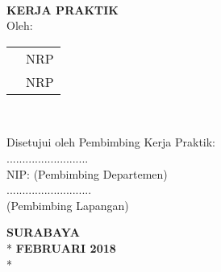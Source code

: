 \newpage
	\thispagestyle{plain}
	\begin{centering}
		\textbf{\MakeUppercase{\judul}} \\[20pt]
		\textbf{\large{KERJA PRAKTIK}} \\[20pt]
		
		Oleh: \\
		\begin{tabular}{ll}
			\MakeUppercase{\namaPenulisSatu} & \hspace{20pt} NRP \nrpPenulisSatu \\
			\MakeUppercase{\namaPenulisDua} & \hspace{20pt} NRP \nrpPenulisDua \\
		\end{tabular}\\[30pt]
	\end{centering}

	{\noindent Disetujui oleh Pembimbing Kerja Praktik:}\\[30pt]         
	\pembimbingDept \hfill \hfill .......................... \\
	NIP: \nipPembimbingDept \hfill \hfill (Pembimbing Departemen) \\[50pt]
	{\noindent \pembimbingLap  \hfill \hfill ...........................}  \\
	\jabatanPembimbingLap \hfill \hfill (Pembimbing Lapangan) \\[20pt] 

	\begin{centering}
		\textbf{SURABAYA} \\*
		\textbf{FEBRUARI 2018} \\*
	\end{centering}
	\cleardoublepage